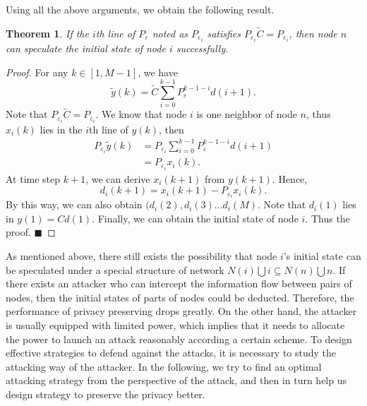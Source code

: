 \documentclass[10pt,journal,compsoc]{IEEEtran}
\newtheorem{thm}{Theorem}
\newtheorem{proof}{Proof}
\begin{document}
Using all the above arguments, we obtain the following result.
\begin{thm}
If the $i$th line of $P_{\varepsilon}$ noted as $P_{\varepsilon_i}$ satisfies $P_{\varepsilon_i}\tilde{C}=P_{\varepsilon_i}$, then node $n$ can speculate the initial state of node $i$ successfully.
\end{thm}

\begin{proof}
For any $k\in[1, M-1]$, we have
\[\tilde{y}(k)=\tilde{C}\sum_{i=0}^{k-1}P_{\varepsilon}^{k-1-i}d(i+1).\]
Note that $P_{\varepsilon_i}\tilde{C}=P_{\varepsilon_i}$. We know that node $i$ is one neighbor of node $n$, thus $x_{i}(k)$ lies in the $i$th line of $y(k)$, then
\begin{equation}
\begin{split}
P_{\varepsilon_i}\tilde{y}(k)&=P_{\varepsilon_i}\sum_{i=0}^{k-1}P_{\varepsilon}^{k-1-i}d(i+1)\\
&=P_{\varepsilon_i}x_{i}(k).
\end{split}
\end{equation}
At time step $k+1$, we can derive $x_{i}(k+1)$ from $y(k+1)$. Hence,
\begin{equation}
d_{i}(k+1)=x_{i}(k+1)-P_{\varepsilon_i}x_{i}(k).
\end{equation}
By this way, we can also obtain $(d_{i}(2), d_{i}(3)...d_{i}(M)$. Note that $d_{i}(1)$ lies in $y(1)=Cd(1)$. Finally, we can obtain the initial state of node $i$. Thus the proof. $\blacksquare$
\end{proof}

As mentioned above, there still exists the possibility that node $i$'s initial state can be speculated under a special structure of network $N(i)\bigcup{i}\subseteq N(n)\bigcup{n}$. If there exists an attacker who can intercept the information flow between pairs of nodes, then the initial states of parts of nodes could be deducted. Therefore, the performance of privacy preserving drops greatly. On the other hand, the attacker is usually equipped with limited power, which implies that it needs to allocate the power to launch an attack reasonably according a certain scheme. To design effective strategies to defend against the attacks, it is necessary to study the attacking way of the attacker. In the following, we try to find an optimal attacking strategy from the perspective of the attack, and then in turn help us design strategy to preserve the privacy better.
\end{document}
